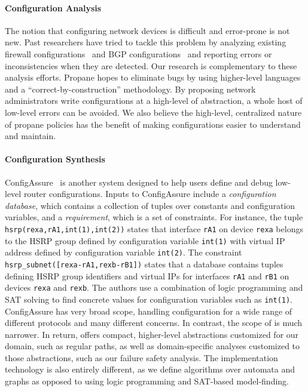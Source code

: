 \paragraph*{Configuration Analysis}  The notion that
configuring network devices is difficult and error-prone is not new.  Past 
researchers have
tried to tackle this problem by analyzing existing 
firewall configurations~\cite{fang,lumeta,margrave} and
BGP configurations~\cite{feamster+:rcc,feamster:thesis,ipassure,batfish,bagpipe} and reporting errors or
inconsistencies when they are detected. 
Our research is complementary to these analysis
efforts.  Propane hopes to eliminate bugs by using higher-level
languages and a ``correct-by-construction''
methodology.  By proposing network administrators write configurations
at a high-level of abstraction, a whole host of low-level errors can be 
avoided.  We also believe the high-level, centralized nature of propane policies
has the benefit of making configurations
easier to understand and maintain.

\paragraph*{Configuration Synthesis}  
ConfigAssure~\cite{narain:lisa05,narain+:configassure} 
is another system designed to
help users define and debug low-level router
configurations.  Inputs to
ConfigAssure include a \emph{configuration database}, which contains a
collection of tuples over constants and configuration variables, and a
\emph{requirement}, which is a set of constraints.  For instance, the
tuple \texttt{hsrp(rexa,rA1,int(1),int(2))} states that interface
\texttt{rA1} on device \texttt{rexa} belongs to the HSRP group defined
by configuration variable \texttt{int(1)} with virtual IP address
defined by configuration variable \texttt{int(2)}.  The constraint
\texttt{hsrp\_subnet([rexa-rA1,rexb-rB1])} states that a database
contains tuples defining HSRP group identifiers and virtual IPs for
interfaces \texttt{rA1} and \texttt{rB1} on devices \texttt{rexa} and
\texttt{rexb}.  The authors use a combination of logic programming and
SAT solving to find concrete values for configuration variables such
as \texttt{int(1)}.  ConfigAssure has very broad scope, handling
configuration for a wide range of different protocols and many
different concerns.  In contrast, the scope of \sysname is much
narrower.  In return, \sysname offers compact, higher-level
abstractions customized for our domain, such as regular paths, as well
as domain-specific analyses customized to those abstractions, such as
our failure safety analysis.  The implementation technology is also
entirely different, as we define algorithms over automata and graphs
as opposed to using logic programming and SAT-based model-finding.
